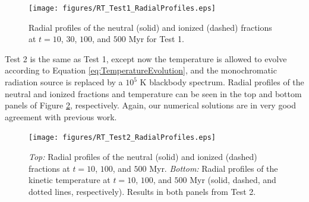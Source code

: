 \documentclass[preprint2]{aastex}              %
\begin{document}
\begin{figure}[htbp]
\centering
\texttt{[image: figures/RT\_Test1\_RadialProfiles.eps]} 
\caption[]{Radial profiles of the neutral (solid) and ionized (dashed) fractions at $t = 10$, $30$, $100$, and $500$ Myr for Test 1.}
\label{fig:RT_Test1_RadialProfiles}
\end{figure}

Test 2 is the same as Test 1, except now the temperature is allowed to evolve according to Equation \ref{eq:TemperatureEvolution}, and the monochromatic radiation source is replaced by a $10^5$ K blackbody spectrum.  Radial profiles of the neutral and ionized fractions and temperature can be seen in the top and bottom panels of Figure \ref{fig:RT_Test2_RadialProfiles}, respectively.  Again, our numerical solutions are in very good agreement with previous work.

\begin{figure}[htbp]
\centering
\texttt{[image: figures/RT\_Test2\_RadialProfiles.eps]}
\caption{\textit{Top:} Radial profiles of the neutral (solid) and ionized (dashed) fractions at $t = 10$, $100$, and $500$ Myr. \textit{Bottom:} Radial profiles of the kinetic temperature at $t = 10$, $100$, and $500$ Myr (solid, dashed, and dotted lines, respectively).  Results in both panels from Test 2.}
\label{fig:RT_Test2_RadialProfiles}
\end{figure}
\end{document}
